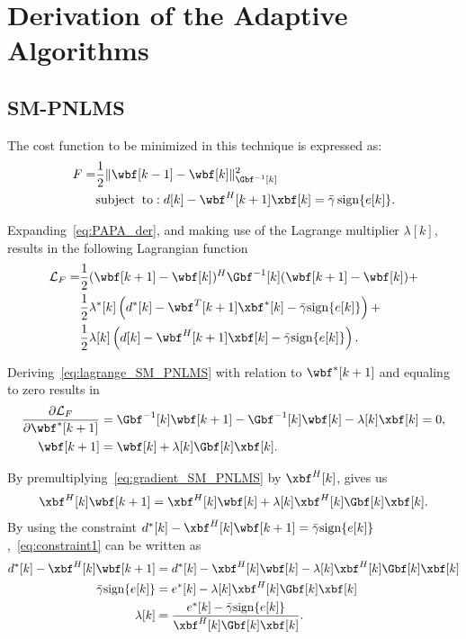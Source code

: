 \chapter{Derivation of the Adaptive Algorithms}
\label{appendixA}

\section{SM-PNLMS}
\label{ap:SM_PNLMS}
The cost function to be minimized in this technique is expressed as:
\begin{align}\label{eq:PAPA_der}
\begin{split}
	F = &\frac{1}{2}\Vert \wbf[k-1] - \wbf[k] \Vert_{\Gbf^{-1}[k]}^2\\
	&\mathrm{subject\;\;to:\;} d[k] - 
\wbf^H[k+1]\xbf[k] = \bar{\gamma}\,\mathrm{sign}\{e[k]\}.
\end{split}
\end{align}

Expanding~\eqref{eq:PAPA_der}, and making use of the Lagrange multiplier $\lambda[k]$, results in the following Lagrangian function
\begin{align}\label{eq:lagrange_SM_PNLMS}
	\begin{split}
		\mathcal{L}_F =& \frac{1}{2}(\wbf[k+1] - \wbf[k])^H\Gbf^{-1}[k](\wbf[k+1] - \wbf[k]) + \\
		&\frac{1}{2}\lambda^*[k]\left(d^*[k] - \wbf^T[k+1]\xbf^*[k] - \bar{\gamma}\mathrm{sign}\{e[k]\}\right) + \\
		&\frac{1}{2}\lambda[k]\left(d[k] - \wbf^H[k+1]\xbf[k] - \bar{\gamma}\mathrm{sign}\{e[k]\}\right).
	\end{split}
\end{align}

Deriving~\eqref{eq:lagrange_SM_PNLMS} with relation to $\wbf^*[k+1]$ and equaling to zero results in
\begin{align}
	\frac{\partial \mathcal{L}_F}{\partial \wbf^*[k+1]} &= \Gbf^{-1}[k]\wbf[k+1] - \Gbf^{-1}[k]\wbf[k] - \lambda[k]\xbf[k] = 0, \\
	\wbf[k+1] &= \wbf[k]+ \lambda[k]\Gbf[k]\xbf[k].\label{eq:gradient_SM_PNLMS}
\end{align}

By premultiplying~\eqref{eq:gradient_SM_PNLMS} by $\xbf^H[k]$, gives us
\begin{align}\label{eq:constraint1}
	\xbf^H[k]\wbf[k+1] = \xbf^H[k]\wbf[k]+ \lambda[k]\xbf^H[k]\Gbf[k]\xbf[k].
\end{align}
By using the constraint $d^*[k] - \xbf^H[k]\wbf[k+1] = \bar{\gamma}\mathrm{sign}\{e[k]\}$,~\eqref{eq:constraint1} can be written as
\begin{align}
	d^*[k] - \xbf^H[k]\wbf[k+1] &= d^*[k] - \xbf^H[k]\wbf[k] - \lambda[k]\xbf^H[k]\Gbf[k]\xbf[k] \nonumber\\
	\bar{\gamma}\mathrm{sign}\{e[k]\} &= e^*[k] - \lambda[k]\xbf^H[k]\Gbf[k]\xbf[k]\nonumber \\
	\lambda[k] & = \frac{e^*[k] - \bar{\gamma}\mathrm{sign}\{e[k]\}}{\xbf^H[k]\Gbf[k]\xbf[k]}.\label{eq:lambda}
\end{align}

